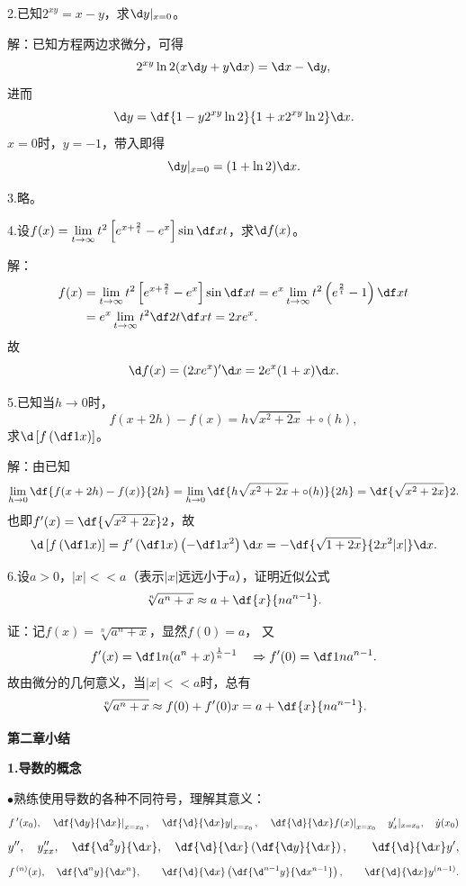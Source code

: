 \bigskip

2.已知$2^{xy}=x-y$，求$\d y|_{x=0}$。

解：已知方程两边求微分，可得
$$2^{xy}\ln2(x\d y+y\d x)=\d x-\d y,$$
进而
$$\d y=\df{1-y2^{xy}\ln2}{1+x2^{xy}\ln2}\d x.$$
$x=0$时，$y=-1$，带入即得
$$\d y|_{x=0}=(1+\ln2)\d x.$$
\fin

\bigskip

3.略。

\bigskip

4.设$f(x)=\lim\limits_{t\to\infty}t^2
\left[e^{x+\frac2t}-e^x\right]\sin\df xt$，求$\d f(x)$。

解：
\begin{align*}
	f(x)&=\lim\limits_{t\to\infty}t^2
	\left[e^{x+\frac2t}-e^x\right]\sin\df xt
	=e^x\lim\limits_{t\to\infty}t^2
	\left(e^{\frac2t}-1\right)\df xt\\
	&=e^x\lim\limits_{t\to\infty}t^2\df2t\df xt
	=2xe^x.
\end{align*}
故
$$\d f(x)=(2xe^x)'\d x=2e^x(1+x)\d x.$$
\fin

\bigskip

5.已知当$h\to 0$时，
$$f(x+2h)-f(x)=h\sqrt{x^2+2x}+\circ(h),$$
求$\d\left[f\left(\df1x\right)\right]$。

解：由已知
$$\lim\limits_{h\to0}\df{f(x+2h)-f(x)}{2h}
=\lim\limits_{h\to0}\df{h\sqrt{x^2+2x}+\circ(h)}{2h}
=\df{\sqrt{x^2+2x}}2.
$$
也即$f'(x)=\df{\sqrt{x^2+2x}}2$，故
$$\d\left[f\left(\df1x\right)\right]
=f'\left(\df1x\right)\left(-\df1{x^2}\right)\d x
=-\df{\sqrt{1+2x}}{2x^2|x|}\d x.$$
\fin

\bigskip

6.设$a>0$，$|x|<<a$（表示$|x|$远远小于$a$），证明近似公式
$$\sqrt[n]{a^n+x}\approx a+\df{x}{na^{n-1}}.$$

证：记$f(x)=\sqrt[n]{a^n+x}$，显然$f(0)=a$，
又
$$f'(x)=\df1n(a^n+x)^{\frac1n-1}\quad
\Rightarrow f'(0)=\df1{na^{n-1}}.
$$
故由微分的几何意义，当$|x|<<a$时，总有
$$\sqrt[n]{a^n+x}\approx f(0)+f'(0)x
=a+\df{x}{na^{n-1}}.$$
\fin

\newpage

\begin{center}
	\Large\bf 第二章小结
\end{center}

{\bf 1.导数的概念}

$\bullet$熟练使用导数的各种不同符号，理解其意义：
$$f\,'(x_0),\quad \left.\df{\d y}{\d x}\right|_{x=x_0},\quad\left.\df{\d
}{\d x}y\right|_{x=x_0},\quad \left.\df{\d }{\d x}f(x)\right|_{x=x_0}\quad
y'_x|_{x=x_0},\quad \dot{y}(x_0)$$
$$y'',\quad y''_{xx},\quad \df{\d^2y}{\d x},
\quad \df{\d}{\d x}\left(\df{\d y}{\d x}\right),\quad
\quad \df{\d}{\d x}y',$$
$$f^{\,(n)}(x),\quad \df{\d^n y}{\d x^n},\quad
\quad \df{\d}{\d x}\left(\df{\d^{n-1} y}{\d x^{n-1}}\right),\quad
\quad \df{\d}{\d x}y^{(n-1)}.$$

